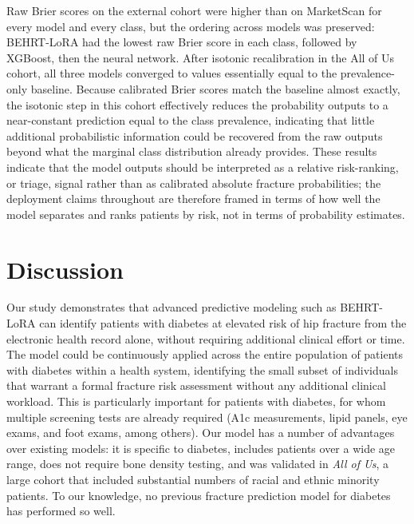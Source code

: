 \documentclass[12pt]{article}
\begin{document}
Raw Brier scores on the external cohort were higher than on MarketScan for every model and every class, but the ordering across models was preserved: BEHRT-LoRA had the lowest raw Brier score in each class, followed by XGBoost, then the neural network. After isotonic recalibration in the All of Us cohort, all three models converged to values essentially equal to the prevalence-only baseline. Because calibrated Brier scores match the baseline almost exactly, the isotonic step in this cohort effectively reduces the probability outputs to a near-constant prediction equal to the class prevalence, indicating that little additional probabilistic information could be recovered from the raw outputs beyond what the marginal class distribution already provides. These results indicate that the model outputs should be interpreted as a relative risk-ranking, or triage, signal rather than as calibrated absolute fracture probabilities; the deployment claims throughout are therefore framed in terms of how well the model separates and ranks patients by risk, not in terms of probability estimates.


\section{Discussion}

Our study demonstrates that advanced predictive modeling such as BEHRT-LoRA can identify patients with diabetes at elevated risk of hip fracture from the electronic health record alone, without requiring additional clinical effort or time. The model could be continuously applied across the entire population of patients with diabetes within a health system, identifying the small subset of individuals that warrant a formal fracture risk assessment without any additional clinical workload. This is particularly important for patients with diabetes, for whom multiple screening tests are already required (A1c measurements, lipid panels, eye exams, and foot exams, among others). Our model has a number of advantages over existing models: it is specific to diabetes, includes patients over a wide age range, does not require bone density testing, and was validated in \textit{All of Us}, a large cohort that included substantial numbers of racial and ethnic minority patients. To our knowledge, no previous fracture prediction model for diabetes has performed so well.
\end{document}
